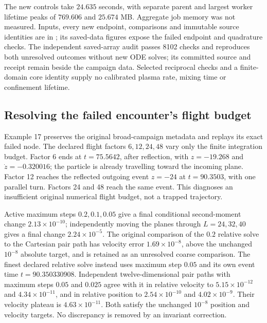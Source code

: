 \documentclass[11pt,letterpaper]{article}
\begin{document}
The new controls take $24.635$ seconds, with separate parent and largest
worker lifetime peaks of $769.606$ and $25.674$ MB. Aggregate job memory
was not measured. Inputs, every new endpoint, comparisons and immutable
source identities are in ; its
saved-data figures expose the failed endpoint and quadrature checks.
The independent saved-array audit passes 8102 checks and reproduces
both unresolved outcomes without new ODE solves; its committed source
and receipt remain beside the campaign data.
Selected reciprocal checks and a finite-domain core identity supply
no calibrated plasma rate, mixing time or confinement lifetime.

\subsection*{Resolving the failed encounter's flight budget}
Example 17 preserves the original broad-campaign metadata and replays its
exact failed node. The declared flight factors $6,12,24,48$ vary only the
finite integration budget. Factor 6 ends at $t=75.5642$, after reflection,
with $z=-19.268$ and $\dot z=-0.320016$; the particle is already travelling
toward the incoming plane. Factor 12 reaches the reflected outgoing event
$z=-24$ at $t=90.3503$, with one parallel turn. Factors 24 and 48 reach the
same event. This diagnoses an insufficient original numerical flight budget,
not a trapped trajectory.

Active maximum steps $0.2,0.1,0.05$ give a final conditional second-moment
change $2.13\times10^{-10}$; independently moving the planes through
$L=24,32,40$ gives a final change $2.24\times10^{-5}$. The original comparison
of the $0.2$ relative solve to the Cartesian pair path has velocity error
$1.69\times10^{-8}$, above the unchanged $10^{-8}$ absolute target, and
is retained as an unresolved coarse comparison. The finest declared relative
solve instead uses maximum step $0.05$ and its own event time
$t=90.350330908$. Independent twelve-dimensional pair paths with maximum
steps $0.05$ and $0.025$ agree with it in relative velocity to
$5.15\times10^{-12}$ and $4.34\times10^{-11}$, and in relative position to
$2.54\times10^{-10}$ and $4.02\times10^{-9}$. Their velocity plateau is
$4.63\times10^{-11}$. Both satisfy the unchanged $10^{-8}$ position and
velocity targets. No discrepancy is removed by an invariant correction.
\end{document}
